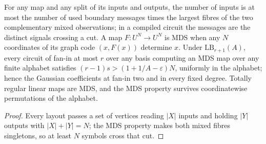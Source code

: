 \begin{theorem}
  \label{thm:lowerbounds-frontier-mds}
  \leanok
  For any map and any split of its inputs and outputs, the number of inputs is at
  most the number of used boundary messages times the largest fibres of the two
  complementary mixed observations; in a compiled circuit the messages are the
  distinct signals crossing a cut. A map $F:U^N\to U^N$ is MDS when any $N$
  coordinates of its graph code $(x,F(x))$ determine $x$. Under
  $\mathrm{LB}_{r+1}(A)$, every circuit of fan-in at most $r$ over any basis
  computing an MDS map over any finite alphabet satisfies
  $(r-1)s>(1+1/A-\varepsilon)N$, uniformly in the alphabet; hence the Gaussian
  coefficients at fan-in two and in every fixed degree. Totally regular linear
  maps are MDS, and the MDS property survives coordinatewise permutations of the
  alphabet.
\end{theorem}
\begin{proof}
  \leanok
  Every layout passes a set of vertices reading $|X|$ inputs and holding $|Y|$
  outputs with $|X|+|Y|=N$; the MDS property makes both mixed fibres singletons,
  so at least $N$ symbols cross that cut.
\end{proof}

